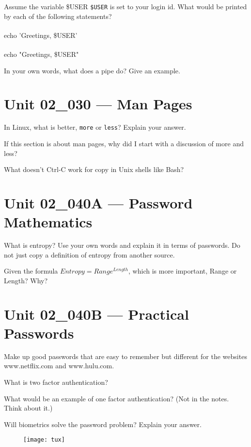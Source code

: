 \documentclass[letterpaper,12pt]{exam}
\newcommand{\unit}{Unit 02}
\begin{document}
\begin {questions}
\begin{samepage}
\begin{checkboxes}
\end{checkboxes}
\end{samepage}

\begin{samepage}
	\question Assume the variable \$USER \texttt{\$USER} is set to your login id.  What would be printed by each of the following statements? 
\\\\
	echo 'Greetings, \$USER'
	\\\\
	echo "Greetings, \$USER"

\end{samepage}

\question In your own words, what does a pipe do?  Give an example. 

\section*{\unit\_030 --- Man Pages} %
 
\question In Linux, what is better, \texttt{more} or \texttt{less}?  Explain your answer. 
\vspace{1.25cm}

\question If this section is about man pages, why did I start with a discussion of more and less? 
\vspace{1.25cm}

\question What doesn't Ctrl-C work for copy in Unix shells like Bash? 

\section*{\unit\_040A --- Password Mathematics} %

\question What is entropy?  Use your own words and explain it in terms of passwords.  Do not just copy a definition of entropy from another source. 
\vspace{1.25cm}

\question Given the formula \(Entropy = Range^{Length} \), which is more important, Range or Length?  Why?

\section*{\unit\_040B --- Practical Passwords} %

\question Make up good passwords that are easy to remember but different for the websites www.netflix.com and www.hulu.com. 
\vspace{1.25cm}

\question What is two factor authentication?
\vspace{1.25cm}

\question What would be an example of one factor authentication?  (Not in the notes.  Think about it.) 
\vspace{1.25cm}

\question Will biometrics solve the password problem?  Explain your answer. 
\vspace{1.25cm}
\end{questions}
\begin{figure}[b]\label{end}
	\center
	\texttt{[image: tux]}
	{}
\end{figure}
\end{document}

